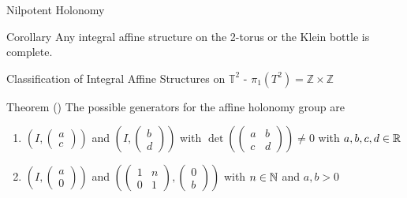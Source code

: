 \begin{frame}[c]{Nilpotent Holonomy}
	\begin{kulblock}{Corollary}
		Any integral affine structure on the 2-torus or the Klein bottle is complete.
	\end{kulblock}
\end{frame}

\begin{frame}[c]{Classification of Integral Affine Structures on $\mathbb{T}^2$ - $\pi_1(T^2) =  \mathbb{Z} \times \mathbb{Z}$}
	\begin{kulblock}{Theorem (\cite{MISHACHEV1996301})}
		The possible generators for the affine holonomy group are
		\begin{enumerate}
			\item $(I, \begin{pmatrix}
					      a \\ c
				      \end{pmatrix})$ and $(I, \begin{pmatrix}
					      b \\ d
				      \end{pmatrix})$ with $\det(\begin{pmatrix}
					      a & b \\ c & d
				      \end{pmatrix}) \neq 0$ with $a,b,c,d \in \mathbb{R}$

			\item $(I, \begin{pmatrix}
					      a \\ 0
				      \end{pmatrix})$ and $(\begin{pmatrix}
					      1 & n \\ 0 & 1
				      \end{pmatrix}, \begin{pmatrix}
					      0 \\ b
				      \end{pmatrix})$ with $n \in \mathbb{N}$ and $a,b >0$
		\end{enumerate}
	\end{kulblock}
\end{frame}


